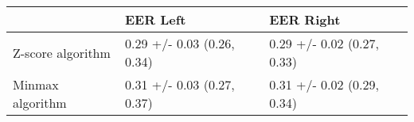 \begin{tabular}{lll}
\toprule
{} &                    EER Left &                   EER Right \\
\midrule
Z-score algorithm &  0.29 +/- 0.03 (0.26, 0.34) &  0.29 +/- 0.02 (0.27, 0.33) \\
Minmax algorithm  &  0.31 +/- 0.03 (0.27, 0.37) &  0.31 +/- 0.02 (0.29, 0.34) \\
\bottomrule
\end{tabular}
